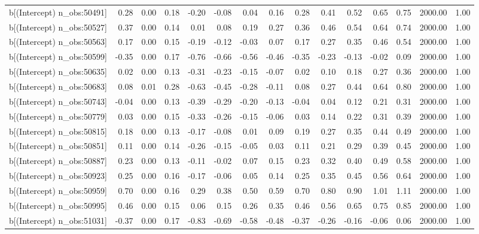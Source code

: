 \begin{table}[ht]
\begin{tabular}{rrrrrrrrrrrrrrr}
  b[(Intercept) n\_obs:50491] & 0.28 & 0.00 & 0.18 & -0.20 & -0.08 & 0.04 & 0.16 & 0.28 & 0.41 & 0.52 & 0.65 & 0.75 & 2000.00 & 1.00 \\ 
  b[(Intercept) n\_obs:50527] & 0.37 & 0.00 & 0.14 & 0.01 & 0.08 & 0.19 & 0.27 & 0.36 & 0.46 & 0.54 & 0.64 & 0.74 & 2000.00 & 1.00 \\ 
  b[(Intercept) n\_obs:50563] & 0.17 & 0.00 & 0.15 & -0.19 & -0.12 & -0.03 & 0.07 & 0.17 & 0.27 & 0.35 & 0.46 & 0.54 & 2000.00 & 1.00 \\ 
  b[(Intercept) n\_obs:50599] & -0.35 & 0.00 & 0.17 & -0.76 & -0.66 & -0.56 & -0.46 & -0.35 & -0.23 & -0.13 & -0.02 & 0.09 & 2000.00 & 1.00 \\ 
  b[(Intercept) n\_obs:50635] & 0.02 & 0.00 & 0.13 & -0.31 & -0.23 & -0.15 & -0.07 & 0.02 & 0.10 & 0.18 & 0.27 & 0.36 & 2000.00 & 1.00 \\ 
  b[(Intercept) n\_obs:50683] & 0.08 & 0.01 & 0.28 & -0.63 & -0.45 & -0.28 & -0.11 & 0.08 & 0.27 & 0.44 & 0.64 & 0.80 & 2000.00 & 1.00 \\ 
  b[(Intercept) n\_obs:50743] & -0.04 & 0.00 & 0.13 & -0.39 & -0.29 & -0.20 & -0.13 & -0.04 & 0.04 & 0.12 & 0.21 & 0.31 & 2000.00 & 1.00 \\ 
  b[(Intercept) n\_obs:50779] & 0.03 & 0.00 & 0.15 & -0.33 & -0.26 & -0.15 & -0.06 & 0.03 & 0.14 & 0.22 & 0.31 & 0.39 & 2000.00 & 1.00 \\ 
  b[(Intercept) n\_obs:50815] & 0.18 & 0.00 & 0.13 & -0.17 & -0.08 & 0.01 & 0.09 & 0.19 & 0.27 & 0.35 & 0.44 & 0.49 & 2000.00 & 1.00 \\ 
  b[(Intercept) n\_obs:50851] & 0.11 & 0.00 & 0.14 & -0.26 & -0.15 & -0.05 & 0.03 & 0.11 & 0.21 & 0.29 & 0.39 & 0.45 & 2000.00 & 1.00 \\ 
  b[(Intercept) n\_obs:50887] & 0.23 & 0.00 & 0.13 & -0.11 & -0.02 & 0.07 & 0.15 & 0.23 & 0.32 & 0.40 & 0.49 & 0.58 & 2000.00 & 1.00 \\ 
  b[(Intercept) n\_obs:50923] & 0.25 & 0.00 & 0.16 & -0.17 & -0.06 & 0.05 & 0.14 & 0.25 & 0.35 & 0.45 & 0.56 & 0.64 & 2000.00 & 1.00 \\ 
  b[(Intercept) n\_obs:50959] & 0.70 & 0.00 & 0.16 & 0.29 & 0.38 & 0.50 & 0.59 & 0.70 & 0.80 & 0.90 & 1.01 & 1.11 & 2000.00 & 1.00 \\ 
  b[(Intercept) n\_obs:50995] & 0.46 & 0.00 & 0.15 & 0.06 & 0.15 & 0.26 & 0.35 & 0.46 & 0.56 & 0.65 & 0.75 & 0.85 & 2000.00 & 1.00 \\ 
  b[(Intercept) n\_obs:51031] & -0.37 & 0.00 & 0.17 & -0.83 & -0.69 & -0.58 & -0.48 & -0.37 & -0.26 & -0.16 & -0.06 & 0.06 & 2000.00 & 1.00 \\ 

\end{tabular}
\end{table}
